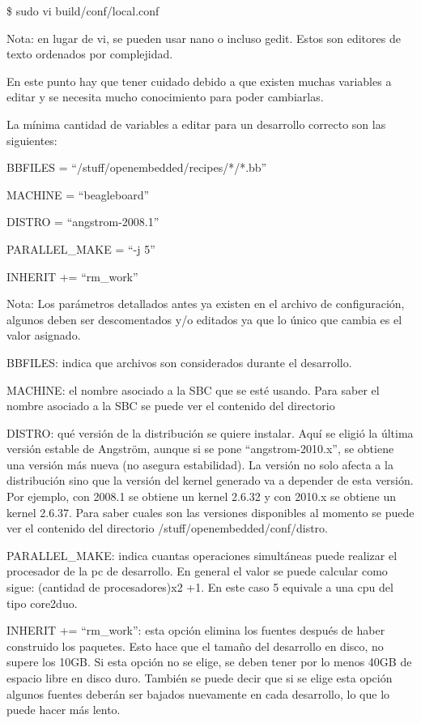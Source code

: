 \centerline{\$ sudo vi build/conf/local.conf}

\bigskip
Nota: en lugar de vi, se pueden usar nano o incluso gedit. Estos son editores de texto ordenados por complejidad.

\bigskip
En este punto hay que tener cuidado debido a que existen muchas variables a editar y se necesita mucho conocimiento para poder cambiarlas.


La mínima cantidad de variables a editar para un desarrollo correcto son las siguientes:

\bigskip
BBFILES = “/stuff/openembedded/recipes/*/*.bb”

MACHINE = “beagleboard”

DISTRO = “angstrom-2008.1”

PARALLEL\_MAKE = “-j 5”

INHERIT += “rm\_work”

\bigskip
Nota: Los parámetros detallados antes ya existen en el archivo de configuración, algunos deben ser descomentados y/o editados ya que lo único que cambia es el valor asignado.

\bigskip
BBFILES: indica que archivos son considerados durante el desarrollo.

\bigskip
MACHINE: el nombre asociado a la SBC que se esté usando. Para saber el nombre asociado a la SBC se puede ver el contenido del directorio


\bigskip
DISTRO: qué versión de la distribución se quiere instalar. Aquí se eligió la última versión estable de Angström, aunque si se pone “angstrom-2010.x”, se obtiene una versión más nueva (no asegura estabilidad). La versión no solo afecta a la distribución sino que la versión del kernel generado va a depender de esta versión. Por ejemplo, con 2008.1 se obtiene un kernel 2.6.32 y con 2010.x se obtiene un kernel 2.6.37. Para saber cuales son las versiones disponibles al momento se puede ver el contenido del directorio 
/stuff/openembedded/conf/distro.

\bigskip
PARALLEL\_MAKE: indica cuantas operaciones simultáneas puede realizar el procesador de la pc de desarrollo. En general el valor se puede calcular como sigue: (cantidad de procesadores)x2 +1. En este caso 5 equivale a una cpu del tipo core2duo.

\bigskip
INHERIT += “rm\_work”: esta opción elimina los fuentes después de haber construido los paquetes. Esto hace que el tamaño del desarrollo en disco, no supere los 10GB. Si esta opción no se elige, se deben tener por lo menos 40GB de espacio libre en disco duro. También se puede decir que si se elige esta opción algunos fuentes deberán ser bajados nuevamente en cada desarrollo, lo que lo puede hacer más lento.


